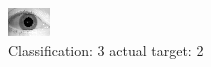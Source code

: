 \begin{figure}[h!]
\begin{center}
\includegraphics[width=0.60\columnwidth]{figures/ID1625_class_3_target_2.png}
\end{center}
\caption{ Classification: 3 actual target: 2}
\label{fig:ID1625_class_3_target_2}
\end{figure}

